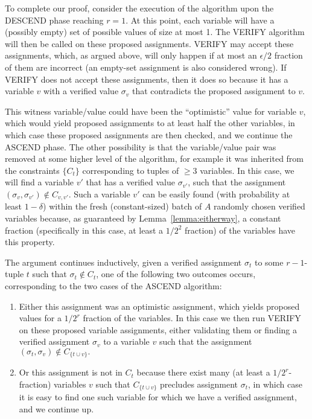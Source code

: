 \documentclass[anon,12pt]{colt2018}
\newcommand{\eps}{\epsilon}
\begin{document}
To complete our proof, consider the execution of the algorithm upon the DESCEND phase reaching $r=1$.  At this point, each variable will have a (possibly empty) set of possible values of size at most 1.  The VERIFY algorithm will then be called on these proposed assignments.  VERIFY may accept these assignments, which, as argued above, will only happen if at most an $\eps/2$ fraction of them are incorrect (an empty-set assignment is also considered wrong). If VERIFY does not accept these assignments, then it does so because it has a variable $v$ with a verified value $\sigma_v$ that contradicts the proposed assignment to $v$.

This witness variable/value could have been the ``optimistic'' value for variable $v$, which would yield proposed assignments to at least half the other variables, in which case these proposed assignments are then checked, and we continue the ASCEND phase.  The other possibility is that the variable/value pair was removed at some higher level of the algorithm, for example it was inherited from the constraints $\{C_t\}$ corresponding to tuples of $\ge 3$ variables.  In this case, we will find a variable $v'$ that has a verified value $\sigma_{v'}$, such that the assignment $(\sigma_v,\sigma_{v'}) \not \in C_{v,v'}.$  Such a variable $v'$ can be easily found (with probability at least $1-\delta$) within the fresh (constant-sized) batch of $A$ randomly chosen verified variables because, as guaranteed by Lemma~\ref{lemma:eitherway}, a constant fraction (specifically  in this case, at least a $1/2^{2}$ fraction) of the variables have this property.   

The argument continues inductively, given a verified assignment $\sigma_t$ to some $r-1$-tuple $t$ such that $\sigma_t \not \in C_t$, one of the following two outcomes occurs, corresponding to the two cases of the ASCEND algorithm:
\begin{enumerate}
\item Either this assignment was an optimistic assignment, which yields proposed values for a $1/2^r$ fraction of the variables.  In this case we then run VERIFY on these proposed variable assignments, either validating them or finding a verified assignment $\sigma_v$ to a variable $v$ such that the assignment $(\sigma_t,\sigma_v) \not \in C_{\{t \cup v\}}.$
\item Or this assignment is not in $C_t$ because there exist many (at least  a $1/2^r$-fraction) variables $v$ such that $C_{\{t \cup v\}}$ precludes assignment $\sigma_t$, in which case it is easy to find one such variable for which we have a verified assignment, and we continue up.
\end{enumerate}
\end{document}
